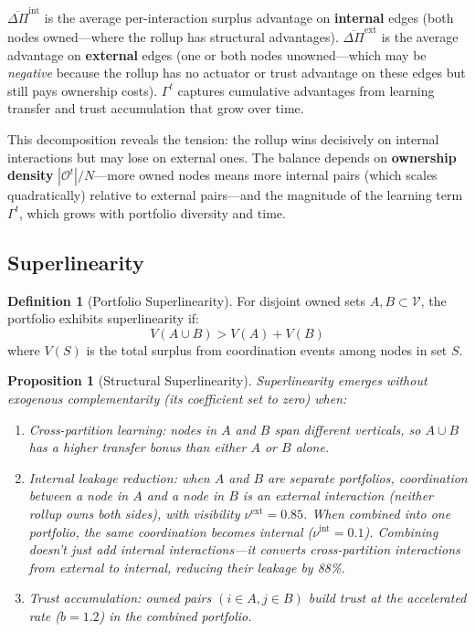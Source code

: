 \documentclass[12pt]{article}
\newtheorem{proposition}{Proposition}
\theoremstyle{definition}
\newtheorem{definition}{Definition}
\begin{document}
\noindent $\overline{\Delta\Pi}^{\text{int}}$ is the average per-interaction surplus advantage on \textbf{internal} edges (both nodes owned---where the rollup has structural advantages). $\overline{\Delta\Pi}^{\text{ext}}$ is the average advantage on \textbf{external} edges (one or both nodes unowned---which may be \textit{negative} because the rollup has no actuator or trust advantage on these edges but still pays ownership costs). $\Gamma^t$ captures cumulative advantages from learning transfer and trust accumulation that grow over time.

This decomposition reveals the tension: the rollup wins decisively on internal interactions but may lose on external ones. The balance depends on \textbf{ownership density} $|\mathcal{O}^t|/N$---more owned nodes means more internal pairs (which scales quadratically) relative to external pairs---and the magnitude of the learning term $\Gamma^t$, which grows with portfolio diversity and time.

\subsection{Superlinearity}

\begin{definition}[Portfolio Superlinearity]
For disjoint owned sets $A, B \subset \mathcal{V}$, the portfolio exhibits superlinearity if:
\begin{equation}
V(A \cup B) > V(A) + V(B)
\end{equation}
\noindent where $V(S)$ is the total surplus from coordination events among nodes in set $S$.
\end{definition}

\begin{proposition}[Structural Superlinearity]
\label{prop:super}
Superlinearity emerges without exogenous complementarity (its coefficient set to zero) when:
\begin{enumerate}
\item[(i)] Cross-partition learning: nodes in $A$ and $B$ span different verticals, so $A \cup B$ has a higher transfer bonus than either $A$ or $B$ alone.
\item[(ii)] Internal leakage reduction: when $A$ and $B$ are separate portfolios, coordination between a node in $A$ and a node in $B$ is an \textit{external} interaction (neither rollup owns both sides), with visibility $\nu^{\text{ext}} = 0.85$. When combined into one portfolio, the same coordination becomes \textit{internal} ($\nu^{\text{int}} = 0.1$). Combining doesn't just add internal interactions---it \textit{converts} cross-partition interactions from external to internal, reducing their leakage by 88\%.
\item[(iii)] Trust accumulation: owned pairs $(i \in A, j \in B)$ build trust at the accelerated rate ($b = 1.2$) in the combined portfolio.
\end{enumerate}
\end{proposition}
\end{document}
